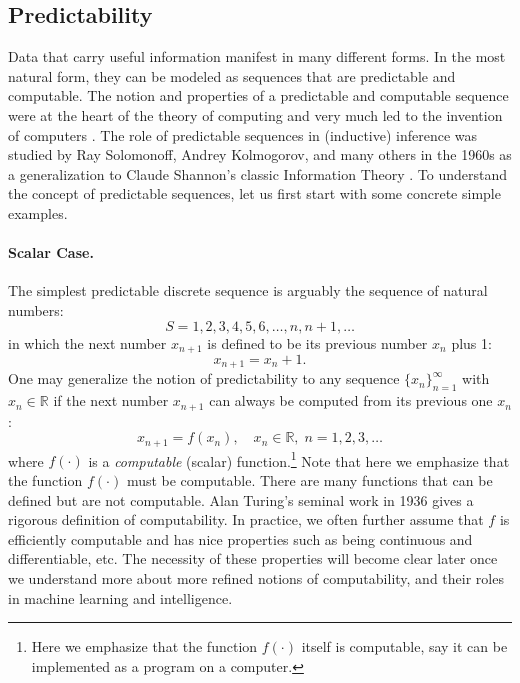\documentclass[\toplevelprefix/book-main.tex]{subfiles}
\begin{document}
\subsection{Predictability}
\label{sec:predictability}
Data that carry useful information manifest in many different forms. In the most natural form, they can be modeled as sequences that are predictable and computable. The notion and properties of a predictable and computable sequence were at the heart of the theory of computing and very much led to the invention of computers \cite{Turing-1936}. The role of predictable sequences in (inductive) inference was studied by Ray Solomonoff, Andrey Kolmogorov, and many others in the 1960s \cite{Kolmogorov1998OnTO} as a generalization to Claude Shannon's classic Information Theory \cite{Shannon-1948}. To understand the concept of predictable sequences, let us first start with some concrete simple examples. 
\paragraph{Scalar Case.} The simplest predictable discrete sequence is arguably the sequence of natural numbers:
\begin{equation}
   {S} =  1, 2, 3, 4, 5, 6, \ldots, n, n+1, \ldots
\end{equation}
in which the next number $x_{n+1}$ is defined to be its previous number $x_n$ plus 1:
\begin{equation}
x_{n+1} = x_n + 1.    
\end{equation}
One may generalize the notion of predictability to any sequence $\{x_n\}_{n=1}^\infty$ with $ x_n \in \mathbb{R}$ if the next number $x_{n+1}$ can always be computed from its previous one $x_n$:
\begin{equation}
    x_{n+1} = f(x_{n}), \quad x_n \in \mathbb{R}, \; n =  1, 2, 3, \ldots
\end{equation}
where $f(\cdot)$ is a {\em computable} (scalar) function.\footnote{Here we emphasize that the function $f(\cdot)$ itself is computable, say it can be implemented as a program on a computer. } Note that here we emphasize that the function $f(\cdot)$ must be computable. There are many functions that can be defined but are not computable. Alan Turing's seminal work in 1936 \cite{Turing-1936} gives a rigorous definition of computability. In practice, we often further assume that $f$ is efficiently computable and has nice properties such as being continuous and differentiable, etc. The necessity of these properties will become clear later once we understand more about more refined notions of computability, and their roles in machine learning and intelligence.
\end{document}
